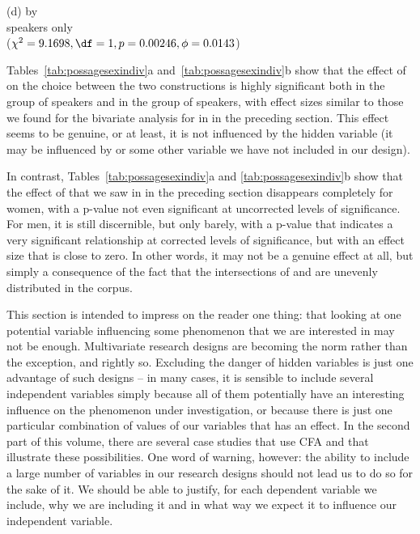 \begin{table}
\begin{minipage}{.45\textwidth}
\footnotesize{(d)  by } \\
\footnotesize{ speakers only} \\
\tiny{($\chi^2 = 9.1698, \df = 1, p = 0.00246, \phi = 0.0143$)}
\end{minipage}
\end{table}

Tables~\ref{tab:possagesexindiv}a and~\ref{tab:possagesexindiv}b show that the effect of  on the choice between the two constructions is highly significant  both in the group of  speakers and in the group of  speakers, with effect sizes  similar to those we found for the bivariate  analysis for  in  in the preceding section. This effect seems to be genuine, or at least, it is not influenced by the hidden variable  (it may be influenced by  or some other variable we have not included in our  design).

In contrast, Tables~\ref{tab:possagesexindiv}a and \ref{tab:possagesexindiv}b show that the effect of  that we saw in  in the preceding section disappears completely for women, with a p\hyp{}value not even significant  at uncorrected levels of significance. For men, it is still discernible, but only barely, with a p\hyp{}value that indicates a very significant relationship at corrected levels of significance, but with an effect size  that is close to zero. In other words, it may not be a genuine effect at all, but simply a consequence of the fact that the intersections of  and  are unevenly distributed  in the corpus.

This section is intended to impress on the reader one thing: that looking at one potential variable influencing some phenomenon that we are interested in may not be enough. Multivariate  research designs  are becoming the norm rather than the exception, and rightly so. Excluding the danger of hidden variables is just one advantage of such designs -- in many cases, it is sensible to include several independent variables simply because all of them potentially have an interesting influence on the phenomenon under investigation, or because there is just one particular combination of values of our variables that has an effect. In the second part of this volume, there are several case studies that use CFA  and that illustrate these possibilities. One word of warning, however: the ability to include a large number of variables in our research designs  should not lead us to do so for the sake of it. We should be able to justify, for each dependent variable we include, why we are including it and in what way we expect it to influence our independent variable.

